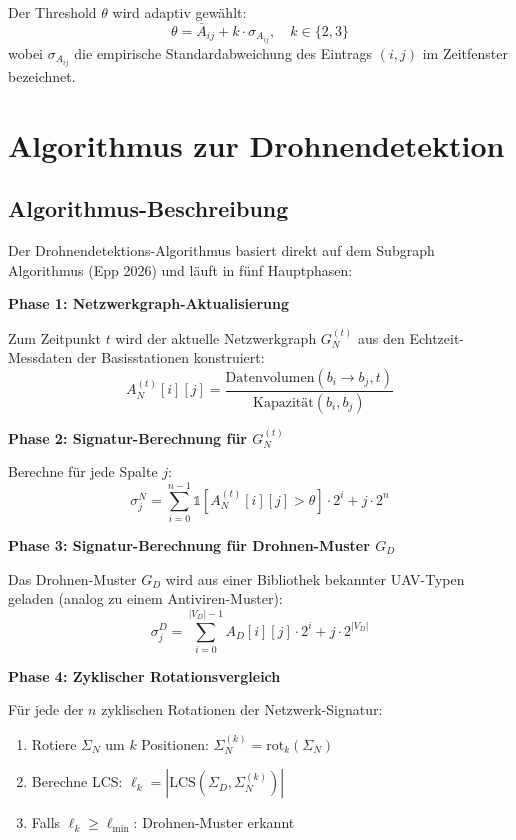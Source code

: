 ﻿\documentclass[a4paper,12pt]{article}
\theoremstyle{definition}
\begin{document}
Der Threshold $\theta$ wird adaptiv gew\"ahlt:
\[
\theta = \bar{A}_{ij} + k \cdot \sigma_{A_{ij}}, \quad k \in \{2, 3\}
\]
wobei $\sigma_{A_{ij}}$ die empirische Standardabweichung des Eintrags $(i,j)$
im Zeitfenster bezeichnet.

\section{Algorithmus zur Drohnendetektion}
\label{sec:algorithmus}

\subsection{Algorithmus-Beschreibung}

Der Drohnendetektions-Algorithmus basiert direkt auf dem Subgraph Algorithmus
(Epp 2026) und l\"auft in f\"unf Hauptphasen:

\medskip
\textbf{Phase 1: Netzwerkgraph-Aktualisierung}

Zum Zeitpunkt $t$ wird der aktuelle Netzwerkgraph $G_N^{(t)}$ aus den
Echtzeit-Messdaten der Basisstationen konstruiert:
\[
A_N^{(t)}[i][j] = \frac{\text{Datenvolumen}(b_i \to b_j, t)}{\text{Kapazit\"at}(b_i, b_j)}
\]

\textbf{Phase 2: Signatur-Berechnung f\"ur $G_N^{(t)}$}

Berechne f\"ur jede Spalte $j$:
\[
\sigma_j^N = \sum_{i=0}^{n-1} \mathbb{1}[A_N^{(t)}[i][j] > \theta] \cdot 2^i + j \cdot 2^n
\]

\textbf{Phase 3: Signatur-Berechnung f\"ur Drohnen-Muster $G_D$}

Das Drohnen-Muster $G_D$ wird aus einer Bibliothek bekannter UAV-Typen geladen
(analog zu einem Antiviren-Muster):
\[
\sigma_j^D = \sum_{i=0}^{|V_D|-1} A_D[i][j] \cdot 2^i + j \cdot 2^{|V_D|}
\]

\textbf{Phase 4: Zyklischer Rotationsvergleich}

F\"ur jede der $n$ zyklischen Rotationen der Netzwerk-Signatur:
\begin{enumerate}
    \item Rotiere $\Sigma_N$ um $k$ Positionen: $\Sigma_N^{(k)} = \mathrm{rot}_k(\Sigma_N)$
    \item Berechne LCS: $\ell_k = |\mathrm{LCS}(\Sigma_D, \Sigma_N^{(k)})|$
    \item Falls $\ell_k \geq \ell_{\min}$: Drohnen-Muster erkannt
\end{enumerate}
\end{document}
